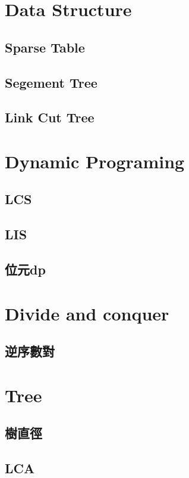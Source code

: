 \section{Data Structure}
\subsection{Sparse Table}

\subsection{Segement Tree}

\subsection{Link Cut Tree}


\section{Dynamic Programing}
\subsection{LCS}

\subsection{LIS}

\subsection{位元dp}


\section{Divide and conquer}
\subsection{逆序數對}


\section{Tree}
\subsection{樹直徑}

\subsection{LCA}
